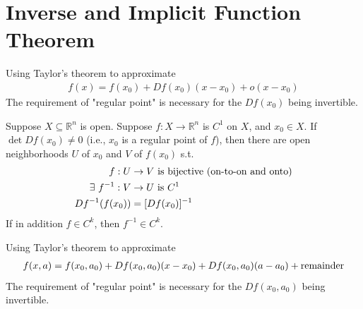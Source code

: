 \documentclass[11pt]{elegantbook}
\begin{document}
\section{Inverse and Implicit Function Theorem}
Using Taylor's theorem to approximate
\begin{equation}
    \begin{aligned}
        f(x)=f(x_0)+Df(x_0)(x-x_0)+o(x-x_0)
    \end{aligned}
    \nonumber
\end{equation}
The requirement of "regular point" is necessary for the $Df(x_0)$ being invertible.
\begin{theorem}
    Suppose $X \subseteq \mathbb{R}^n$ is open. Suppose $f : X \rightarrow \mathbb{R}^n$ is $C^1$ on $X$, and $x_0\in X$. If $\det Df(x_0)\neq 0$ (i.e., $x_0$ is a regular point of $f$), then there are open neighborhoods $U$ of $x_0$ and $V$ of $f(x_0)$ s.t.
    \begin{equation}
        \begin{aligned}
            f:U &\rightarrow V \textnormal{ is bijective (on-to-on and onto)}\\
            \exists\ f^{-1}:V &\rightarrow U \textnormal{ is }C^1\\
            Df^{-1}(f(x_0))&=[Df(x_0)]^{-1}
        \end{aligned}
        \nonumber
    \end{equation}
    If in addition $f \in C^k$, then $f^{-1} \in C^k$.
\end{theorem}

Using Taylor's theorem to approximate
\begin{equation}
    \begin{aligned}
        f(x,a)=f(x_0,a_0)+Df(x_0,a_0)(x-x_0)+Df(x_0,a_0)(a-a_0)+\textnormal{remainder}
    \end{aligned}
    \nonumber
\end{equation}
The requirement of "regular point" is necessary for the $Df(x_0,a_0)$ being invertible.
\end{document}

